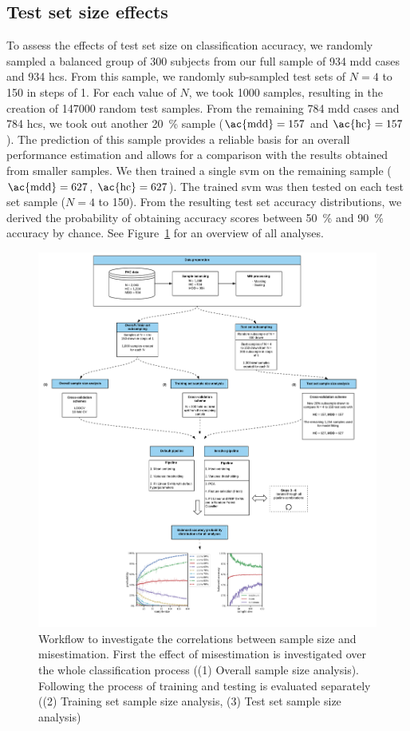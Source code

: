 \documentclass[12pt,a4paper]{article}
\begin{document}
    \subsection{Test set size effects}
    To assess the effects of test set size on classification accuracy, we randomly sampled a balanced group of \num{300} subjects from our full sample of \num{934} \ac{mdd} cases and \num{934} \acp{hc}. From this sample, we randomly sub-sampled test sets of $N=\num{4}$ to \num{150} in steps of \num{1}. For each value of $N$, we took \num{1000} samples, resulting in the creation of \num{147000} random test samples. From the remaining \num{784} \ac{mdd} cases and \num{784} \acp{hc}, we took out another \SI{20}{\percent} sample ($\text{\ac{mdd}}=157$ and $\text{\ac{hc}}=157$). The prediction of this sample provides a reliable basis for an overall performance estimation and allows for a comparison with the results obtained from smaller samples. We then trained a single \ac{svm} on the remaining sample ($\text{\ac{mdd}}=627$, $\text{\ac{hc}}=627$). The trained \ac{svm} was then tested on each test set sample ($N=\num{4}$ to \num{150}). From the resulting test set accuracy distributions, we derived the probability of obtaining accuracy scores between \SI{50}{\percent} and \SI{90}{\percent} accuracy by chance. See Figure~\ref{fig:workflow} for an overview of all analyses.

    \begin{figure}
        \includegraphics[width=\textwidth]{./images/figure_1}
        \caption{Workflow to investigate the correlations between sample size and misestimation. First the effect of misestimation is investigated over the whole classification process ((1) Overall sample size analysis). Following the process of training and testing is evaluated separately ((2) Training set sample size analysis, (3) Test set sample size analysis)}
        \label{fig:workflow}
    \end{figure}
\end{document}
